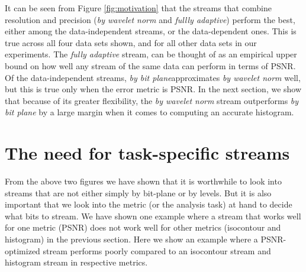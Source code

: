 It can be seen from Figure \ref{fig:motivation} that the streams that combine resolution and
precision (\emph{by wavelet norm} and \emph{fullly adaptive}) perform the best, either among the
data-independent streams, or the data-dependent ones. This is true across all four data sets shown,
and for all other data sets in our experiments. The \emph{fully adaptive} stream, can be thought of
as an empirical upper bound on how well any stream of the same data can perform in terms of PSNR. Of
the data-independent streams, \emph{by bit plane}approximates \emph{by wavelet norm}  well, but this
is true only when the error metric is PSNR. In the next section, we show that because of its greater
flexibility, the \emph{by wavelet norm} stream outperforms \emph{by bit plane} by a large margin
when it comes to computing an accurate histogram.




\section{The need for task-specific streams}
From the above two figures we have shown that it is worthwhile to look into streams that are not
either simply by bit-plane or by levels. But it is also important that we look into the metric (or
the analysis task) at hand to decide what bits to stream. We have shown one example where a stream
that works well for one metric (PSNR) does not work well for other metrics (isocontour and
histogram) in the previous section. Here we show an example where a PSNR-optimized stream performs
poorly compared to an isocontour stream and histogram stream in respective metrics.

